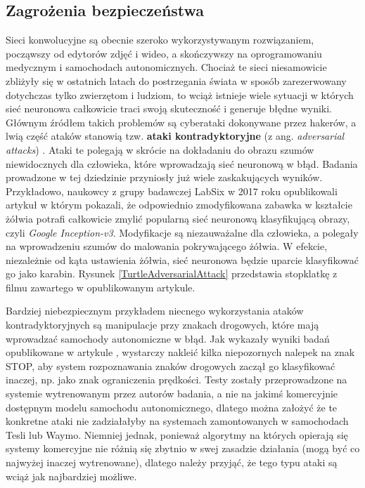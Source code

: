 \subsection{Zagrożenia bezpieczeństwa}
Sieci konwolucyjne są obecnie szeroko wykorzystywanym rozwiązaniem, począwszy od edytorów zdjęć i wideo, a skończywszy na oprogramowaniu medycznym i samochodach autonomicznych. Chociaż te sieci niesamowicie zbliżyły się w ostatnich latach do postrzegania świata w sposób zarezerwowany dotychczas tylko zwierzętom i ludziom, to wciąż istnieje wiele sytuacji w których sieć neuronowa całkowicie traci swoją skuteczność i generuje błędne wyniki. Głównym źródłem takich problemów są cyberataki dokonywane przez hakerów, a lwią część ataków stanowią tzw. \textbf{ataki kontradyktoryjne} (z ang. \textit{adversarial attacks}) \cite{dickson:adversarialMl}. Ataki te polegają w skrócie na dokładaniu do obrazu szumów niewidocznych dla człowieka, które wprowadzają sieć neuronową w błąd. Badania prowadzone w tej dziedzinie przyniosły już wiele zaskakujących wyników. Przykładowo, naukowcy z grupy badawczej LabSix w 2017 roku opublikowali artykuł \cite{labsix:foolingNNs} w którym pokazali, że odpowiednio zmodyfikowana zabawka w kształcie żółwia potrafi całkowicie zmylić popularną sieć neuronową klasyfikującą obrazy, czyli \textit{Google Inception-v3}. Modyfikacje są niezauważalne dla człowieka, a polegały na wprowadzeniu szumów do malowania pokrywającego żółwia. W efekcie, niezależnie od kąta ustawienia żółwia, sieć neuronowa będzie uparcie klasyfikować go jako karabin. Rysunek \ref{TurtleAdversarialAttack} przedstawia stopklatkę z filmu zawartego w opublikowanym artykule.

Bardziej niebezpiecznym przykładem niecnego wykorzystania ataków kontradyktoryjnych są manipulacje przy znakach drogowych, które mają wprowadzać samochody autonomiczne w błąd. Jak wykazały wyniki badań opublikowane w artykule \cite{adversarial:roadSignAttacks}, wystarczy nakleić kilka niepozornych nalepek na znak STOP, aby system rozpoznawania znaków drogowych zaczął go klasyfikować inaczej, np. jako znak ograniczenia prędkości. Testy zostały przeprowadzone na systemie wytrenowanym przez autorów badania, a nie na jakimś komercyjnie dostępnym modelu samochodu autonomicznego, dlatego można założyć że te konkretne ataki nie zadziałałyby na systemach zamontowanych w samochodach Tesli lub Waymo. Niemniej jednak, ponieważ algorytmy na których opierają się systemy komercyjne nie różnią się zbytnio w swej zasadzie działania (mogą być co najwyżej inaczej wytrenowane), dlatego należy przyjąć, że tego typu ataki są wciąż jak najbardziej możliwe. \\

